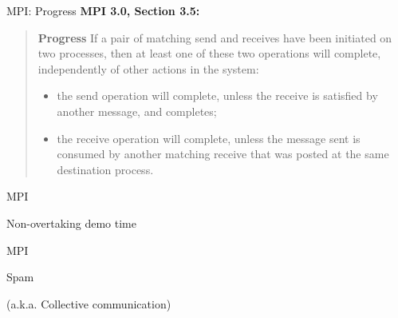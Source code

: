 \documentclass[english,compress]{beamer}
\begin{document}
\begin{frame}{MPI: Progress}
  \textbf{MPI 3.0, Section 3.5:}

  \begin{quote}
    \upshape
    \textbf{Progress} If a pair of matching send and receives have
    been initiated on two processes, then at least one of these two
    operations will complete, independently of other actions in the
    system:

    \begin{itemize}
      \item the send operation will complete, unless the receive is
        satisfied by another message, and completes; 
      \item the receive operation will complete, unless the
        message sent is consumed by another matching receive that 
        was posted at the same destination process.
    \end{itemize}
  \end{quote}
\end{frame}
\begin{frame}{MPI}
  \begin{center}
  \Huge Non-overtaking demo time
  \end{center}
\end{frame}
\begin{frame}{MPI}
  \begin{center}
  \Huge Spam

  \bigskip
  (a.k.a. Collective communication)
  \end{center}
\end{frame}
\end{document}
